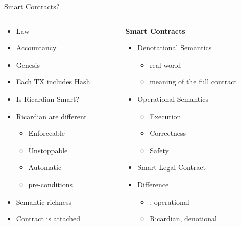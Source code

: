 \documentclass[pdf,table]{beamer}
\begin{document}
\begin{frame}{Smart Contracts?}%
	\begin{columns}[T]
		\begin{column}{0.48\textwidth}
			\begin{itemize}
				\item Law
				\item Accountancy
				\item Genesis
				\item Each TX includes Hash
				\item Is Ricardian Smart?
				\item<2-> Ricardian are different
					\begin{itemize}
						\item<2-> Enforceable
						\item<2-> Unstoppable
						\item<2-> Automatic
						\item<2-> pre-conditions
					\end{itemize}
				\item<2-> Semantic richness
				\item<2-> Contract is attached
			\end{itemize}
		\end{column}
		\begin{column}{0.48\textwidth}
			{\bf Smart Contracts}
			\begin{itemize}
				\item<3-> Denotational Semantics %
					\begin{itemize}
						\item<4-> real-world
						\item<4-> meaning of the full contract
					\end{itemize}
				\item<4-> Operational Semantics %
					\begin{itemize}
						\item<5-> Execution
						\item<5-> Correctness
						\item<5-> Safety
					\end{itemize}
				\item<6-> Smart Legal Contract %
				\item<7-> Difference
					\begin{itemize}
						\item \bitcoinA, operational
						\item Ricardian, denotional
					\end{itemize}
			\end{itemize}	
		\end{column}
	\end{columns}	
\end{frame}
\end{document}
